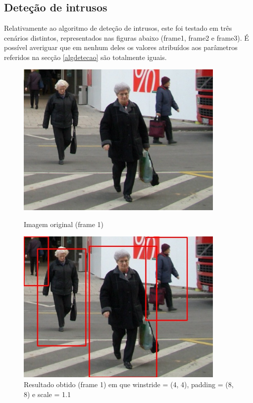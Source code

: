 \subsection{Deteção de intrusos}

Relativamente ao algoritmo de deteção de intrusos, este foi testado em três cenários distintos, representados nas figuras abaixo (frame1, frame2 e frame3). É possível averiguar que em nenhum deles os valores atribuídos aos parâmetros referidos na secção \ref{algdetecao} são totalmente iguais.




\begin{figure}[h]
	\centering
	\begin{minipage}[b]{0.49\textwidth}
		\centering
		\includegraphics[width=0.9\textwidth]{img/vision/exemplos/frame1.jpg}
		\caption[Imagem original (frame 1)]{Imagem original (frame 1) \newline \newline}
		\label{bluetth05-res}
	\end{minipage}
	\hfill
	\begin{minipage}[b]{0.49\textwidth}
		\centering
		\includegraphics[width=0.9\textwidth]{img/vision/exemplos/result_frame1.jpg}
		\caption[Resultado obtido (frame 1)]{Resultado obtido (frame 1) em que  winstride = (4, 4), padding = (8, 8) e scale = 1.1}
		\label{comimageesquema}
	\end{minipage}
\end{figure}



